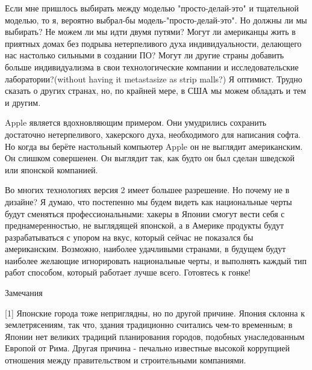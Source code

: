 \documentclass[ebook,12pt,oneside,openany]{memoir}
\begin{document}
Если мне пришлось выбирать между моделью "просто-делай-это" и
тщательной моделью, то я, вероятно выбрал-бы
модель-"просто-делай-это". Но должны ли мы выбирать? Не можем ли мы
идти двумя путями? Могут ли американцы жить в приятных домах без
подрыва нетерпеливого духа индивидуальности, делающего нас настолько
сильными в создании ПО? Могут ли другие страны добавить больше
индивидуализма в свои технологические компании и исследовательские
лаборатории?(without having it metastasize as strip malls?) Я
оптимист. Трудно сказать о других странах, но, по крайней мере, в США
мы можем обладать и тем и другим.

Apple является вдохновляющим примером. Они умудрились сохранить
достаточно нетерпеливого, хакерского духа, необходимого для написания
софта. Но когда вы берёте настольный компьютер Apple он не выглядит
американским. Он слишком совершенен. Он выглядит так, как будто он был
сделан шведской или японской компанией.

Во многих технологиях версия 2 имеет большее разрешение. Но почему не
в дизайне? Я думаю, что постепенно мы будем видеть как национальные
черты будут сменяться профессиональными: хакеры в Японии смогут вести
себя с преднамеренностью, не выглядящей японской, а в Америке продукты
будут разрабатываться с упором на вкус, который сейчас не показался бы
американским. Возможно, наиболее удачливыми странами, в будущем будут
наиболее желающие игнорировать национальные черты, и выполнять каждый
тип работ способом, который работает лучше всего. Готовтесь к гонке!

Замечания

[1] Японские города тоже неприглядны, но по другой причине. Япония
склонна к землетрясениям, так что, здания традиционно считались чем-то
временным; в Японии нет великих традиций планирования городов,
подобных унаследованным Европой от Рима. Другая причина - печально
известные высокой коррупцией отношения между правительством и
строительными компаниями.
\end{document}
